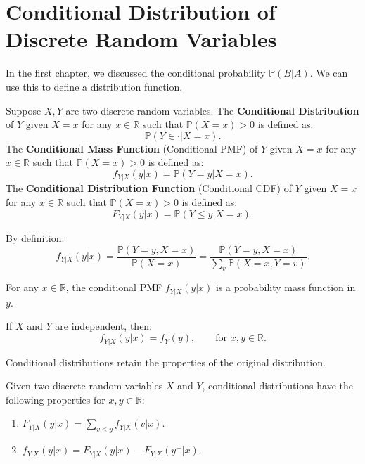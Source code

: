 \documentclass{huhtakm-template-book-v2}
\newcommand{\prob}{\mathbb{P}}
\begin{document}
\section{Conditional Distribution of Discrete Random Variables}
    In the first chapter, we discussed the conditional probability $\prob(B|A)$. We can use this to define a distribution function.
    \begin{defn}
        Suppose $X,Y$ are two discrete random variables. The \textbf{Conditional Distribution} of $Y$ given $X = x$ for any $x \in \mathbb{R}$ such that $\prob(X = x) > 0$ is defined as:
        \begin{equation*}
            \prob(Y \in \cdot|X = x).
        \end{equation*}
        The \textbf{Conditional Mass Function} (Conditional PMF) of $Y$ given $X = x$ for any $x \in \mathbb{R}$ such that $\prob(X = x) > 0$ is defined as:
        \begin{equation*}
            f_{Y|X}(y|x) = \prob(Y = y|X = x).
        \end{equation*}
        The \textbf{Conditional Distribution Function} (Conditional CDF) of $Y$ given $X = x$ for any $x \in \mathbb{R}$ such that $\prob(X = x) > 0$ is defined as:
        \begin{equation*}
            F_{Y|X}(y|x) = \prob(Y \leq y|X = x).
        \end{equation*}
    \end{defn}
    \begin{rem}
        By definition:
        \begin{equation*}
            f_{Y|X}(y|x) = \frac{\prob(Y = y,X = x)}{\prob(X = x)} = \frac{\prob(Y = y,X = x)}{\sum_{v}\prob(X = x,Y = v)}.
        \end{equation*}
    \end{rem}
    \begin{rem}
        For any $x \in \mathbb{R}$, the conditional PMF $f_{Y|X}(y|x)$ is a probability mass function in $y$.
    \end{rem}
    \begin{rem}
        If $X$ and $Y$ are independent, then:
        \begin{equation*}
            f_{Y|X}(y|x) = f_{Y}(y), \qquad\text{for }x,y \in \mathbb{R}.
        \end{equation*}
    \end{rem}
    Conditional distributions retain the properties of the original distribution.
    \begin{lem}
        Given two discrete random variables $X$ and $Y$, conditional distributions have the following properties for $x,y \in \mathbb{R}$:
        \begin{enumerate}
            \item $F_{Y|X}(y|x) = \sum_{v \leq y}f_{Y|X}(v|x)$.
            \item $f_{Y|X}(y|x) = F_{Y|X}(y|x)-F_{Y|X}(y^{-}|x)$.
        \end{enumerate}
    \end{lem}
\end{document}
